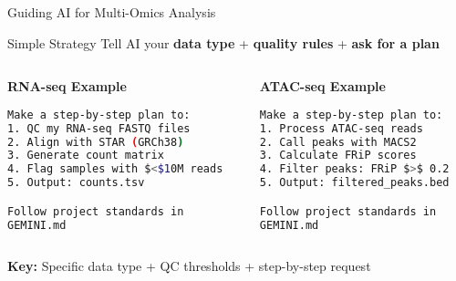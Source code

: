 \documentclass[aspectratio=169]{beamer}
\begin{document}
\begin{frame}[fragile]{Guiding AI for Multi-Omics Analysis}
  \begin{block}{Simple Strategy}
    Tell AI your \textbf{data type} + \textbf{quality rules} + \textbf{ask for a plan}
  \end{block}

  \vspace{0.3cm}

  \begin{columns}[T]
    \begin{column}{0.48\textwidth}
      \centering
      \small\bfseries
      \textcolor{conesaTeal}{RNA-seq Example}

      \vspace{0.2cm}
      \scriptsize

      \begin{lstlisting}[language=bash, basicstyle=\tiny\ttfamily, frame=single, numbers=none]
Make a step-by-step plan to:
1. QC my RNA-seq FASTQ files
2. Align with STAR (GRCh38)
3. Generate count matrix
4. Flag samples with $<$10M reads
5. Output: counts.tsv

Follow project standards in
GEMINI.md
      \end{lstlisting}
    \end{column}
    \begin{column}{0.48\textwidth}
      \centering
      \small\bfseries
      \textcolor{conesaOrange}{ATAC-seq Example}

      \vspace{0.2cm}
      \scriptsize

      \begin{lstlisting}[language=bash, basicstyle=\tiny\ttfamily, frame=single, numbers=none]
Make a step-by-step plan to:
1. Process ATAC-seq reads
2. Call peaks with MACS2
3. Calculate FRiP scores
4. Filter peaks: FRiP $>$ 0.2
5. Output: filtered_peaks.bed

Follow project standards in
GEMINI.md
      \end{lstlisting}
    \end{column}
  \end{columns}

  \vspace{0.3cm}
  \centering
  \footnotesize
  \textbf{Key:} Specific data type + QC thresholds + step-by-step request
\end{frame}
\end{document}
